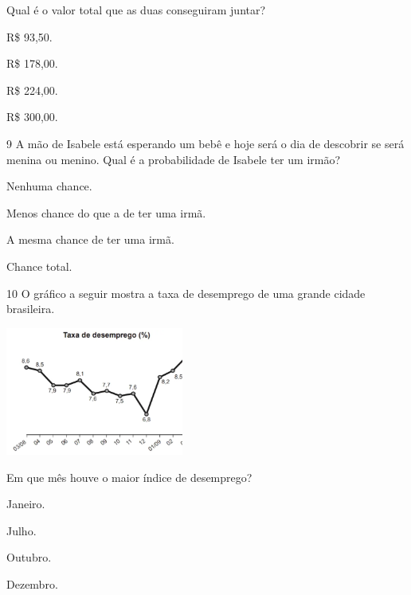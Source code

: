 \begin{mdframed}[linewidth=2pt,linecolor=salmao,roundcorner=2pt]
\begin{escolha}
{\begin{escolha}


Qual é o valor total que as duas conseguiram juntar?

\begin{escolha}
\item
  R\$ 93,50.
\item
  R\$ 178,00.
\item
  R\$ 224,00.
\item
  R\$ 300,00.
\end{escolha}


\num{9} A mão de Isabele está esperando um bebê e hoje será o dia de descobrir
se será menina ou menino. Qual é a probabilidade de Isabele ter um irmão?

\begin{escolha}
\item
  Nenhuma chance.
\item
  Menos chance do que a de ter uma irmã.
\item
  A mesma chance de ter uma irmã.
\item
  Chance total.
\end{escolha}


\num{10} O gráfico a seguir mostra a taxa de desemprego de uma grande cidade
brasileira.



\includegraphics[width=2.29697in,height=1.66026in]{media/image146.png}

Em que mês houve o maior índice de desemprego?

\begin{escolha}
\item
  Janeiro.
\item
  Julho.
\item
  Outubro.
\item
  Dezembro.
\end{escolha}


\end{escolha}}
\end{escolha}
\end{mdframed}
